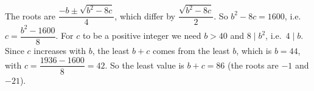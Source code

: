 The roots are $\dfrac{-b\pm\sqrt{b^2-8c}}{4}$, which differ by $\dfrac{\sqrt{b^2-8c}}{2}$. So $b^2-8c=1600$, i.e.\ $c=\dfrac{b^2-1600}{8}$. For $c$ to be a positive integer we need $b>40$ and $8\mid b^2$, i.e.\ $4\mid b$. Since $c$ increases with $b$, the least $b+c$ comes from the least $b$, which is $b=44$, with $c=\dfrac{1936-1600}{8}=42$. So the least value is $b+c=\boxed{86}$ (the roots are $-1$ and $-21$).
